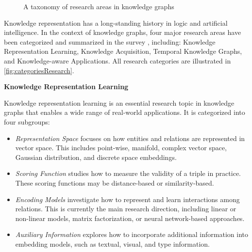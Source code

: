 \begin{figure*}[htp]
{
}
	\caption{
		A taxonomy of research areas in knowledge graphs}
	\label{fig:categoriesResearch}
\end{figure*}


Knowledge representation has a long-standing history in logic and artificial intelligence. In the context of knowledge graphs, four major research areas have been categorized and summarized in the survey \cite{ji2020survey}, including: Knowledge Representation Learning, Knowledge Acquisition, Temporal Knowledge Graphs, and Knowledge-aware Applications. All research categories are illustrated in \autoref{fig:categoriesResearch}.

\textbf{Knowledge Representation Learning}

Knowledge representation learning is an essential research topic in knowledge graphs that enables a wide range of real-world applications. It is categorized into four subgroups:

\begin{itemize}
	\item \textit{Representation Space} focuses on how entities and relations are represented in vector space. This includes point-wise, manifold, complex vector space, Gaussian distribution, and discrete space embeddings.
	
	\item \textit{Scoring Function} studies how to measure the validity of a triple in practice. These scoring functions may be distance-based or similarity-based.
	
	\item \textit{Encoding Models} investigate how to represent and learn interactions among relations. This is currently the main research direction, including linear or non-linear models, matrix factorization, or neural network-based approaches.
	
	\item \textit{Auxiliary Information} explores how to incorporate additional information into embedding models, such as textual, visual, and type information.
\end{itemize}

